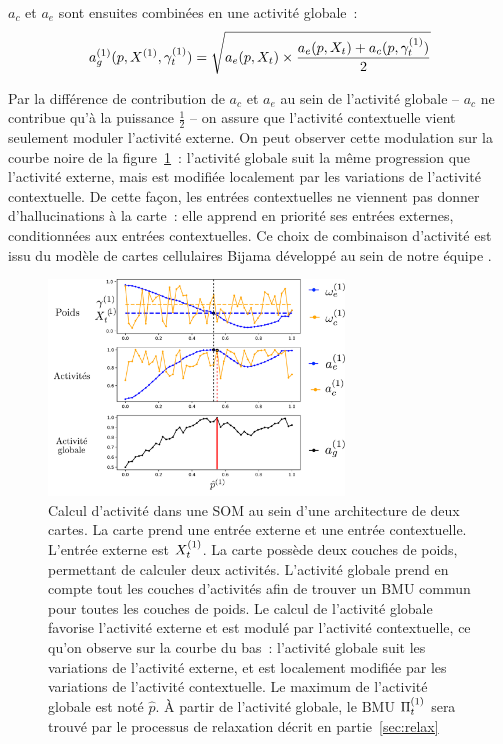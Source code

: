 \documentclass[../main]{subfiles}
\begin{document}
$a_c$ et $a_e$ sont ensuites combinées en une activité globale~:
\begin{equation}
a_g^{({1})}(p, X^{({1})},\gamma^{({1})}_t) = \sqrt{a_e(p, X_t)\times \frac{a_e(p, X_t) + a_c(p,\gamma^{({1})}_t)}{2}}
\end{equation}

Par la différence de contribution de $a_c$ et $a_e$ au sein de l'activité globale -- $a_c$ ne contribue qu'à la puissance $\frac{1}{2}$ -- on assure que l'activité contextuelle vient seulement moduler l'activité externe.
On peut observer cette modulation sur la courbe noire de la figure~\ref{fig:2som_activite}~: l'activité globale suit la même progression que l'activité externe, mais est modifiée localement par les variations de l'activité contextuelle. 
De cette façon, les entrées contextuelles ne viennent pas donner d'\og hallucinations \fg{} à la carte~: elle apprend en priorité ses entrées externes, conditionnées aux entrées contextuelles. Ce choix de combinaison d'activité est issu du modèle de cartes cellulaires Bijama développé au sein de notre équipe \parencite{menard05,khouzam_2013,baheux_towards_2014}.

\begin{figure}
    \centering
    \includegraphics[width=0.7\textwidth]{activite_layers_2maps.pdf}
    \caption{Calcul d'activité dans une SOM au sein d'une architecture de deux cartes. La carte prend une entrée externe et une entrée contextuelle. 
    L'entrée externe est $X^{({1})}_t$. La carte possède deux couches de poids, permettant de calculer deux activités. L'activité globale prend en compte tout les couches d'activités afin de trouver un BMU commun pour toutes les couches de poids. Le calcul de l'activité globale favorise l'activité externe et est modulé par l'activité contextuelle, ce qu'on observe sur la courbe du bas~: l'activité globale suit les variations de l'activité externe, et est localement modifiée par les variations de l'activité contextuelle.
    Le maximum de l'activité globale est noté $\hat{p}$. \`A partir de l'activité globale, le BMU $\Pi^{({1})}_t$ sera trouvé par le processus de relaxation décrit en partie~\ref{sec:relax}\label{fig:2som_activite}}
    \end{figure}
\end{document}
